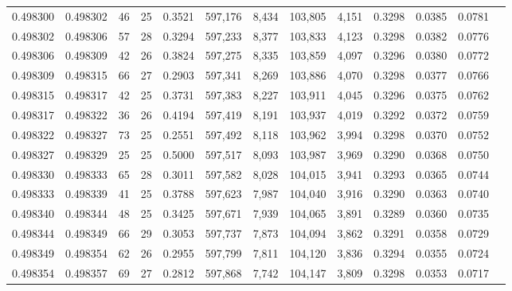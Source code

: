 \begin{tabular}{rrrrrrrrrrrrr}
0.498300 & 0.498302 &  46 &  25 &                                     0.3521 & 597,176 &   8,434 & 103,805 &   4,151 & 0.3298 & 0.0385 & 0.0781 \\
0.498302 & 0.498306 &  57 &  28 &                                     0.3294 & 597,233 &   8,377 & 103,833 &   4,123 & 0.3298 & 0.0382 & 0.0776 \\
0.498306 & 0.498309 &  42 &  26 &                                     0.3824 & 597,275 &   8,335 & 103,859 &   4,097 & 0.3296 & 0.0380 & 0.0772 \\
0.498309 & 0.498315 &  66 &  27 &                                     0.2903 & 597,341 &   8,269 & 103,886 &   4,070 & 0.3298 & 0.0377 & 0.0766 \\
0.498315 & 0.498317 &  42 &  25 &                                     0.3731 & 597,383 &   8,227 & 103,911 &   4,045 & 0.3296 & 0.0375 & 0.0762 \\
0.498317 & 0.498322 &  36 &  26 &                                     0.4194 & 597,419 &   8,191 & 103,937 &   4,019 & 0.3292 & 0.0372 & 0.0759 \\
0.498322 & 0.498327 &  73 &  25 &                                     0.2551 & 597,492 &   8,118 & 103,962 &   3,994 & 0.3298 & 0.0370 & 0.0752 \\
0.498327 & 0.498329 &  25 &  25 &                                     0.5000 & 597,517 &   8,093 & 103,987 &   3,969 & 0.3290 & 0.0368 & 0.0750 \\
0.498330 & 0.498333 &  65 &  28 &                                     0.3011 & 597,582 &   8,028 & 104,015 &   3,941 & 0.3293 & 0.0365 & 0.0744 \\
0.498333 & 0.498339 &  41 &  25 &                                     0.3788 & 597,623 &   7,987 & 104,040 &   3,916 & 0.3290 & 0.0363 & 0.0740 \\
0.498340 & 0.498344 &  48 &  25 &                                     0.3425 & 597,671 &   7,939 & 104,065 &   3,891 & 0.3289 & 0.0360 & 0.0735 \\
0.498344 & 0.498349 &  66 &  29 &                                     0.3053 & 597,737 &   7,873 & 104,094 &   3,862 & 0.3291 & 0.0358 & 0.0729 \\
0.498349 & 0.498354 &  62 &  26 &                                     0.2955 & 597,799 &   7,811 & 104,120 &   3,836 & 0.3294 & 0.0355 & 0.0724 \\
0.498354 & 0.498357 &  69 &  27 &                                     0.2812 & 597,868 &   7,742 & 104,147 &   3,809 & 0.3298 & 0.0353 & 0.0717 \\

\end{tabular}
